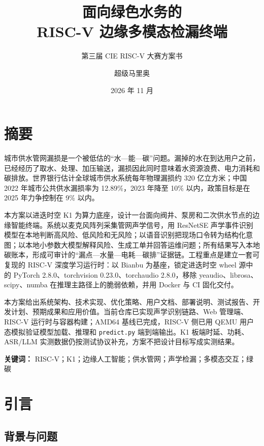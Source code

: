 \documentclass[lang=cn,11pt,scheme=chinese,chinesefont=nofont,color=green]{elegantbook}
\title{面向绿色水务的\\[0.2em]RISC-V 边缘多模态检漏终端}
\subtitle{第三届 CIE RISC-V 大赛方案书}
\author{超级马里奥}
\date{2026 年 11 月}
\begin{document}
\maketitle

\frontmatter

\chapter*{摘要}

城市供水管网漏损是一个被低估的“水—能—碳”问题。漏掉的水在到达用户之前，已经经历了取水、处理、加压输送，漏损因此同时意味着水资源浪费、电力消耗和碳排放。世界银行估计全球城市供水系统每年物理漏损约 320 亿立方米\cite{worldbank}；中国 2022 年城市公共供水漏损率为 12.89\%，2023 年降至 10\% 以内，政策目标是在 2025 年力争控制在 9\% 以内\cite{mohurd}。

本方案以进迭时空 K1 为算力底座，设计一台面向阀井、泵房和二次供水节点的边缘智能终端。系统以麦克风阵列采集管网声学信号，用 ResNetSE 声学事件识别模型在本地判断高风险、低风险和无风险；以语音识别把现场口令转为结构化意图；以本地小参数大模型解释风险、生成工单并回答运维问题；所有结果写入本地碳账本，形成可审计的“漏点—水量—电耗—碳排”证据链。工程重点是建立一套可复现的 RISC-V 深度学习运行时：以 Bianbu 为基座，锁定进迭时空 wheel 源中的 PyTorch 2.8.0、torchvision 0.23.0、torchaudio 2.8.0，移除 yeaudio、librosa、scipy、numba 在推理主路径上的脆弱依赖，并用 Docker 与 CI 固化交付。

本方案给出系统架构、技术实现、优化策略、用户文档、部署说明、测试报告、开发计划、预期成果和应用价值。当前仓库已实现声学识别链路、Web 管理端、RISC-V 运行时与容器构建；AMD64 基线已完成，RISC-V 侧已用 QEMU 用户态模拟验证模型加载、推理和 \texttt{predict.py} 端到端输出。K1 板端时延、功耗、ASR/LLM 实测数据仍按测试协议补充，方案不把设计目标写成实测结果。

\vspace{0.6em}
\noindent\textbf{关键词：} RISC-V；K1；边缘人工智能；供水管网；声学检漏；多模态交互；绿碳

\tableofcontents

\mainmatter

\chapter{引言}
\label{ch:intro}

\section{背景与问题}
\end{document}
